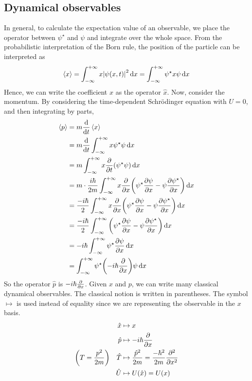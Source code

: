 \subsection{Dynamical observables}
In general, to calculate the expectation value of an observable, we place the operator between \( \psi^\star \) and \( \psi \) and integrate over the whole space.
From the probabilistic interpretation of the Born rule, the position of the particle can be interpreted as
\[
	\left\langle{x}\right\rangle = \int_{-\infty}^{+\infty} x \abs{\psi(x,t)}^2 \dd{x} = \int_{-\infty}^{+\infty} \psi^\star x \psi \dd{x}
\]
Hence, we can write the coefficient \( x \) as the operator \( \hat x \).
Now, consider the momentum.
By considering the time-dependent Schr\"odinger equation with \( U = 0 \), and then integrating by parts,
\begin{align*}
	\left\langle{p}\right\rangle & = m \dv{t} \left\langle{x}\right\rangle                                                                                                              \\
	          & = m \dv{t} \int_{-\infty}^{+\infty} x \psi^\star \psi \dd{x}                                                                      \\
	          & = m \int_{-\infty}^{+\infty} x \pdv{t} \qty( \psi^\star \psi ) \dd{x}                                                             \\
	          & = m \cdot \frac{i \hbar}{2m} \int_{-\infty}^{+\infty} x \pdv{x}\qty( \psi^\star \pdv{\psi}{x} - \psi \pdv{\psi^\star}{x} ) \dd{x} \\
	          & = \frac{-i \hbar}{2} \int_{-\infty}^{+\infty} x \pdv{x}\qty( \psi^\star \pdv{\psi}{x} - \psi \pdv{\psi^\star}{x} ) \dd{x}         \\
	          & = \frac{-i \hbar}{2} \int_{-\infty}^{+\infty} \qty( \psi^\star \pdv{\psi}{x} - \psi \pdv{\psi^\star}{x} ) \dd{x}                  \\
	          & = -i \hbar \int_{-\infty}^{+\infty} \psi^\star \pdv{\psi}{x} \dd{x}                                                               \\
	          & = \int_{-\infty}^{+\infty} \psi^\star \qty(-i \hbar \pdv{x} ) \psi \dd{x}
\end{align*}
So the operator \( \hat p \) is \( -i \hbar \pdv{x} \).
Given \( x \) and \( p \), we can write many classical dynamical observables.
The classical notion is written in parentheses.
The symbol \( \mapsto \) is used instead of equality since we are representing the observable in the \( x \) basis.
\begin{align*}
	\hat x                               & \mapsto x                                                    \\
	\hat p                               & \mapsto -i\hbar \pdv{x}                                      \\
	\qty(T = \frac{p^2}{2m})\quad \hat T & \mapsto \frac{\hat p^2}{2m} = \frac{-\hbar^2}{2m} \pdv[2]{x} \\
	\hat U                               & \mapsto U(\hat x) = U(x)
\end{align*}

